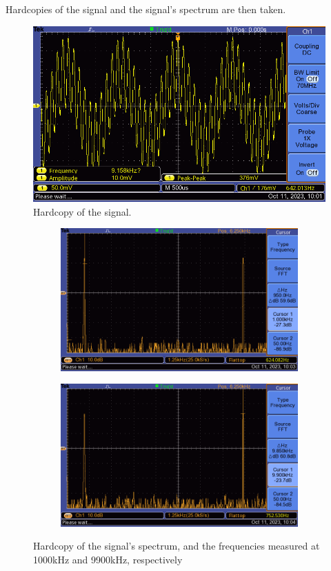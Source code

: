 Hardcopies of the signal and the signal's spectrum are then taken.
\begin{figure}[H]
    \centering
    \includegraphics[width=0.85\linewidth]{images/problem3_hardcopy1.png}
    \caption{Hardcopy of the signal.}
    \label{fig:problem3_hardcopy1}
\end{figure}

\begin{figure}[H]
    \centering
    \begin{subfigure}{0.8\textwidth}
        \includegraphics[width=\linewidth]{images/problem3_hardcopy2.png}
    \end{subfigure}
    \begin{subfigure}{0.8\textwidth}
        \includegraphics[width=\linewidth]{images/problem3_hardcopy3.png}
    \end{subfigure}
    \caption{\centering Hardcopy of the signal's spectrum, and the frequencies measured at 1000kHz and 9900kHz, respectively}
    \label{fig:problem3_hardcopy2}
\end{figure}